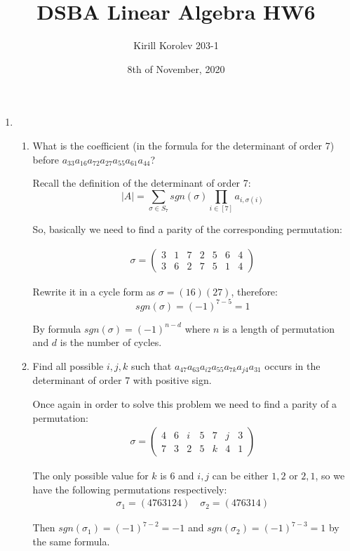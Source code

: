 \documentclass{article}
\title{DSBA Linear Algebra HW6}
\author{Kirill Korolev 203-1}
\date{8th of November, 2020}
\begin{document}
\maketitle

\begin{enumerate}

\item 

\begin{enumerate}
\item What is the coefficient (in the formula for the determinant of order 7) before $a_{33}a_{16}a_{72}a_{27}a_{55}a_{61}a_{44}$?


Recall the definition of the determinant of order 7:
\[|A|=\sum_{\sigma \in S_7} sgn(\sigma) \prod_{i \in [7]} a_{i,\sigma(i)}\]

So, basically we need to find a parity of the corresponding permutation:

\begin{align*}
\sigma=
\begin{pmatrix}
3&1&7&2&5&6&4\\
3&6&2&7&5&1&4
\end{pmatrix}
\end{align*}

Rewrite it in a cycle form as $\sigma=(16)(27)$, therefore:
\[sgn(\sigma)=(-1)^{7-5}=1\]

By formula $sgn(\sigma)=(-1)^{n-d}$ where $n$ is a length of permutation and $d$ is the number of cycles.
\item Find all possible $i, j, k$ such that $a_{47}a_{63}a_{i2}a_{55}a_{7k}a_{j4}a_{31}$ occurs in the determinant of order 7 with positive sign.


Once again in order to solve this problem we need to find a parity of a permutation:
\begin{align*}
\sigma=
\begin{pmatrix}
4&6&i&5&7&j&3\\
7&3&2&5&k&4&1
\end{pmatrix}
\end{align*}

The only possible value for $k$ is $6$ and $i, j$ can be either $1, 2$ or $2, 1$, so we have the following permutations respectively: 
\begin{align*}
\sigma_1=(4763124) \quad \sigma_2=(476314)
\end{align*}

Then $sgn(\sigma_1)=(-1)^{7-2}=-1$ and $sgn(\sigma_2)=(-1)^{7-3}=1$ by the same formula.


\end{enumerate}
\end{enumerate}
\end{document}
